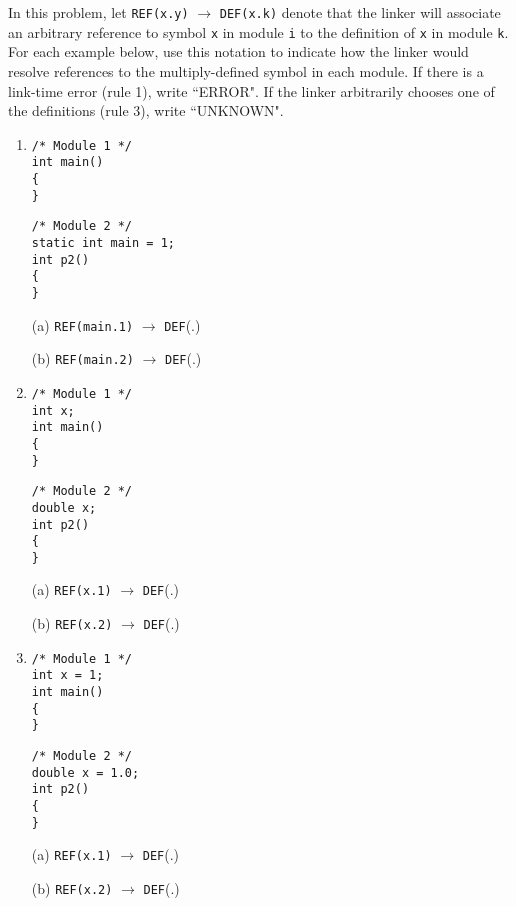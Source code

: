 \documentclass[12pt]{article}
\newenvironment{ex}[2][Exercise]{\begin{trivlist}
		\item[\hskip \labelsep {\bfseries #1}\hskip \labelsep {\bfseries #2.}]}{\end{trivlist}}
\begin{document}
\begin{ex}{7.8}
	In this problem, let \texttt{REF(x.y)} $\to$ \texttt{DEF(x.k)} denote that the linker will associate
	an arbitrary reference to symbol \texttt{x} in module \texttt{i} to the definition of \texttt{x} in
	module \texttt{k}. For each example below, use this notation to indicate how the linker would resolve
	references to the multiply-defined symbol in each module. If there is a link-time error (rule 1), write
	``ERROR". If the linker arbitrarily chooses one of the definitions (rule 3), write ``UNKNOWN".
	\begin{enumerate}[label=(\alph*)]
		\item 
		\begin{lstlisting}
/* Module 1 */
int main()
{
}
		\end{lstlisting}
		\begin{lstlisting}
/* Module 2 */
static int main = 1;
int p2()
{
}
		\end{lstlisting}
		(a) \texttt{REF(main.1)} $\to$ \texttt{DEF}(\makebox[1cm]{\hrulefill}.\makebox[1cm]{\hrulefill})
		
		(b) \texttt{REF(main.2)} $\to$ \texttt{DEF}(\makebox[1cm]{\hrulefill}.\makebox[1cm]{\hrulefill})
		\item 
		\begin{lstlisting}
/* Module 1 */
int x;
int main()
{
}
		\end{lstlisting}
		\begin{lstlisting}
/* Module 2 */
double x;
int p2()
{
}
		\end{lstlisting}
		(a) \texttt{REF(x.1)} $\to$ \texttt{DEF}(\makebox[1cm]{\hrulefill}.\makebox[1cm]{\hrulefill})
	
		(b) \texttt{REF(x.2)} $\to$ \texttt{DEF}(\makebox[1cm]{\hrulefill}.\makebox[1cm]{\hrulefill})
		\item 
		\begin{lstlisting}
/* Module 1 */
int x = 1;
int main()
{
}
		\end{lstlisting}
		\begin{lstlisting}
/* Module 2 */
double x = 1.0;
int p2()
{
}
		\end{lstlisting}
		(a) \texttt{REF(x.1)} $\to$ \texttt{DEF}(\makebox[1cm]{\hrulefill}.\makebox[1cm]{\hrulefill})
		
		(b) \texttt{REF(x.2)} $\to$ \texttt{DEF}(\makebox[1cm]{\hrulefill}.\makebox[1cm]{\hrulefill})
	\end{enumerate}
\end{ex}
\end{document}
